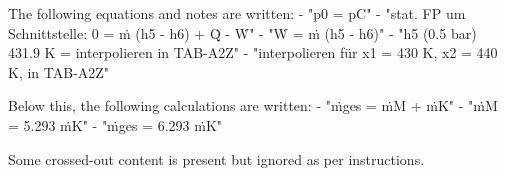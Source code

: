 The following equations and notes are written:  
- "p0 = pC"  
- "stat. FP um Schnittstelle: 0 = ṁ (h5 - h6) + Q̇ - Ẇ"  
- "Ẇ = ṁ (h5 - h6)"  
- "h5 (0.5 bar) 431.9 K = interpolieren in TAB-A2Z"  
- "interpolieren für x1 = 430 K, x2 = 440 K, in TAB-A2Z"  

Below this, the following calculations are written:  
- "ṁges = ṁM + ṁK"  
- "ṁM = 5.293 ṁK"  
- "ṁges = 6.293 ṁK"  

Some crossed-out content is present but ignored as per instructions.